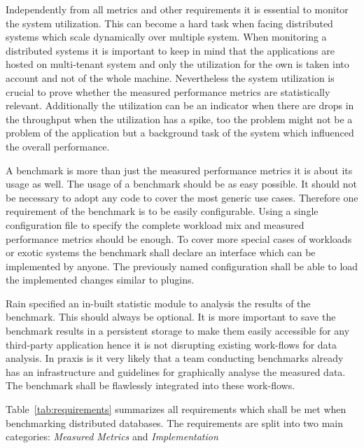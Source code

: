 Independently from all metrics and other requirements it is essential to monitor the system utilization. This can become a hard task when facing distributed systems which scale dynamically over multiple system. When monitoring a distributed systems it is important to keep in mind that the applications are hosted on multi-tenant system and only the utilization for the own is taken into account and not of the whole machine. Nevertheless the system utilization is crucial to prove whether the measured performance metrics are statistically relevant. Additionally the utilization can be an indicator when there are drops in the throughput when the utilization has a spike, too the problem might not be a problem of the application but a background task of the system which influenced the overall performance.

A benchmark is more than just the measured performance metrics it is about its usage as well. The usage of a benchmark should be as easy possible. It should not be necessary to adopt any code to cover the most generic use cases. Therefore one requirement of the benchmark is to be easily configurable. Using a single configuration file to specify the complete workload mix and measured performance metrics should be enough. To cover more special cases of workloads or exotic systems the benchmark shall declare an interface which can be implemented by anyone. The previously named configuration shall be able to load the implemented changes similar to plugins.

Rain specified an in-built statistic module to analysis the results of the benchmark. This should always be optional. It is more important to save the benchmark results in a persistent storage to make them easily accessible for any third-party application hence it is not disrupting existing work-flows for data analysis. In praxis is it very likely that a team conducting benchmarks already has an infrastructure and guidelines for graphically analyse the measured data. The benchmark shall be flawlessly integrated into these work-flows.

Table~\ref{tab:requirements} summarizes all requirements which shall be met when benchmarking distributed databases. The requirements are split into two main categories: \emph{Measured Metrics} and \emph{Implementation}

